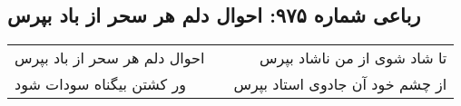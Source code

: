 \begin{center}
\section*{رباعی شماره ۹۷۵: احوال دلم هر سحر از باد بپرس}
\label{sec:0975}
\begin{longtable}{l p{0.5cm} r}
احوال دلم هر سحر از باد بپرس
&&
تا شاد شوی از من ناشاد بپرس
\\
ور کشتن بیگناه سودات شود
&&
از چشم خود آن جادوی استاد بپرس
\\
\end{longtable}
\end{center}
